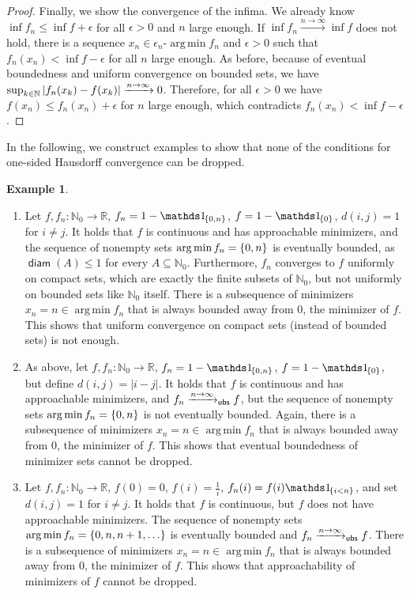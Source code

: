 \documentclass{scrartcl}
\renewcommand{\subset}{\subseteq}
\DeclareMathOperator{\diam}{\mathsf{diam}}
\newcommand{\N}{\mathbb{N}}
\newcommand{\R}{\mathbb{R}}
\DeclareMathOperator*{\argmin}{arg\,min}
\theoremstyle{plain}\newtheorem{theorem}{Theorem}[section]
\theoremstyle{definition}
\newtheorem{example}[theorem]{Example}
\theoremstyle{remark}
\begin{document}
\begin{appendix}
\begin{proof}
		Finally, we show the convergence of the infima. We already know $\inf f_n \leq \inf f + \epsilon$ for all $\epsilon > 0$ and $n$ large enough.
		If $\inf f_n \xrightarrow{n\to\infty} \inf f$ does not hold, there is a sequence $x_n \in \epsilon_n\text{-}\argmin f_n$ and $\epsilon > 0$ such that $f_n(x_n) < \inf f - \epsilon$ for all $n$ large enough. As before, because of eventual boundedness and uniform convergence on bounded sets, we have $\sup_{k\in\N}\abs{f_n(x_k) - f(x_k)} \xrightarrow{n\to\infty} 0$. Therefore, for all $\epsilon >0$ we have $f(x_n) \leq f_n(x_n) + \epsilon$ for $n$ large enough, which contradicts $f_n(x_n) < \inf f - \epsilon$.
\end{proof}
In the following, we construct examples to show that none of the conditions for one-sided Hausdorff convergence can be dropped.
\begin{example}\label{exa:alt:necessary}
\mbox{ }
\begin{enumerate}[label=(\roman*)]
	\item 
	Let $f,f_n\colon \N_0 \to \R$, $f_n = 1-\indOf{\cb{0,n}}$, $f = 1-\indOf{\cb{0}}$, $d(i,j) = 1$ for $i\neq j$.
	It holds that $f$ is continuous and has approachable minimizers, and the sequence of nonempty sets $\argmin f_n = \cb{0,n}$ is eventually bounded, as $\diam(A)\leq1$ for every $A\subset\N_0$. Furthermore, $f_n$ converges to $f$ uniformly on compact sets, which are exactly the finite subsets of $\N_0$, but not uniformly on bounded sets like $\N_0$ itself.
	There is a subsequence of minimizers $x_n=n\in \argmin f_n$ that is always bounded away from $0$, the minimizer of $f$.
	This shows that uniform convergence on compact sets (instead of bounded sets) is not enough.
	\item
	As above, let $f, f_n\colon \N_0 \to \R$, $f_n = 1-\indOf{\cb{0,n}}$, $f = 1-\indOf{\cb{0}}$, but define $d(i,j) = |i-j|$.
	It holds that $f$ is continuous and has approachable minimizers, and $f_n\xrightarrow{n\to\infty}_{\mathsf{ubs}} f$, but the sequence of nonempty sets $\argmin f_n = \cb{0,n}$ is not eventually bounded. 
	Again, there is a subsequence of minimizers $x_n=n\in \argmin f_n$ that is always bounded away from $0$, the minimizer of $f$.
	This shows that eventual boundedness of minimizer sets cannot be dropped.
	\item
	Let $f,f_n\colon \N_0 \to \R$, $f(0) = 0$, $f(i) = \frac1i$, $f_n(i) = f(i)\indOfEvent{i < n}$, and set $d(i,j) = 1$  for $i\neq j$.
	It holds that $f$ is continuous, but $f$ does not have approachable minimizers. The sequence of nonempty sets $\argmin f_n = \cb{0,n, n+1, \dots}$ is eventually bounded and $f_n\xrightarrow{n\to\infty}_{\mathsf{ubs}} f$.
	There is a subsequence of minimizers $x_n=n\in \argmin f_n$ that is always bounded away from $0$, the minimizer of $f$.
	This shows that approachability of minimizers of $f$ cannot be dropped.
\end{enumerate}
\end{example}

\end{appendix}
\end{document}
